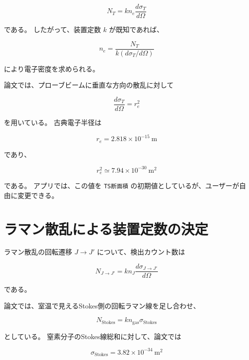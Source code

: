 \documentclass[uplatex,dvipdfmx,11pt]{jsarticle}
\begin{document}
\begin{equation}
N_T = k n_e \frac{d\sigma_T}{d\Omega}
\end{equation}

である。
したがって、装置定数 $k$ が既知であれば、

\begin{equation}
n_e =
\frac{N_T}
{k (d\sigma_T/d\Omega)}
\end{equation}

により電子密度を求められる。

論文では、プローブビームに垂直な方向の散乱に対して

\begin{equation}
\frac{d\sigma_T}{d\Omega}=r_e^2
\end{equation}

を用いている。
古典電子半径は

\begin{equation}
r_e = 2.818 \times 10^{-15} \ \mathrm{m}
\end{equation}

であり、

\begin{equation}
r_e^2 \simeq 7.94 \times 10^{-30} \ \mathrm{m^2}
\end{equation}

である。
アプリでは、この値を \texttt{TS断面積} の初期値としているが、ユーザーが自由に変更できる。

\section{ラマン散乱による装置定数の決定}

ラマン散乱の回転遷移 $J\to J'$ について、検出カウント数は

\begin{equation}
N_{J\to J'}
=
k n_J
\frac{d\sigma_{J\to J'}}{d\Omega}
\end{equation}

である。

論文では、室温で見えるStokes側の回転ラマン線を足し合わせ、

\begin{equation}
N_{\mathrm{Stokes}}
=
k n_{\mathrm{gas}} \sigma_{\mathrm{Stokes}}
\end{equation}

としている。
窒素分子のStokes線総和に対して、論文では

\begin{equation}
\sigma_{\mathrm{Stokes}}
=
3.82 \times 10^{-34} \ \mathrm{m^2}
\end{equation}
\end{document}
